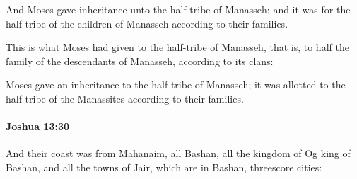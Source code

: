 			\begin{versebox}
					\item[BHS] 
					\item[ASV] And Moses gave inheritance unto the half-tribe of Manasseh: and it was for the half-tribe of the children of Manasseh according to their families.
					\item[NIV] This is what Moses had given to the half-tribe of Manasseh, that is, to half the family of the descendants of Manasseh, according to its clans:
					\item[NRSV] Moses gave an inheritance to the half-tribe of Manasseh; it was allotted to the half-tribe of the Manassites according to their families.
			\end{versebox}

		\paragraph{Joshua 13:30} %
			\label{JOSHUA-13-30}

			And their coast was from Mahanaim, all Bashan, all the kingdom of Og king of Bashan, and all the towns of Jair, which are in Bashan, threescore cities:

